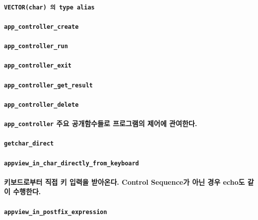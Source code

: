 \documentclass[UTF8]{report}
\begin{document}
            \paragraph{%
                \normalfont \texttt{VECTOR(char) 의 type alias}
            }



            \paragraph{\texttt{app\_controller\_create}}
            \paragraph{\texttt{app\_controller\_run}}
            \paragraph{\texttt{app\_controller\_exit}}
            \paragraph{\texttt{app\_controller\_get\_result}}
            \paragraph{\texttt{app\_controller\_delete}}
            \paragraph{%
                \normalfont \texttt{app\_controller} 주요 공개함수들로 프로그램의 제어에 관여한다.
            }


            \paragraph{\texttt{getchar\_direct}}
            \paragraph{\texttt{appview\_in\_char\_directly\_from\_keyboard}}
            \paragraph{%
                \normalfont 키보드로부터 직접 키 입력을 받아온다. Control Sequence가 아닌 경우 echo도 같이 수행한다.
            }

            \paragraph{\texttt{appview\_in\_postfix\_expression}}
\end{document}
